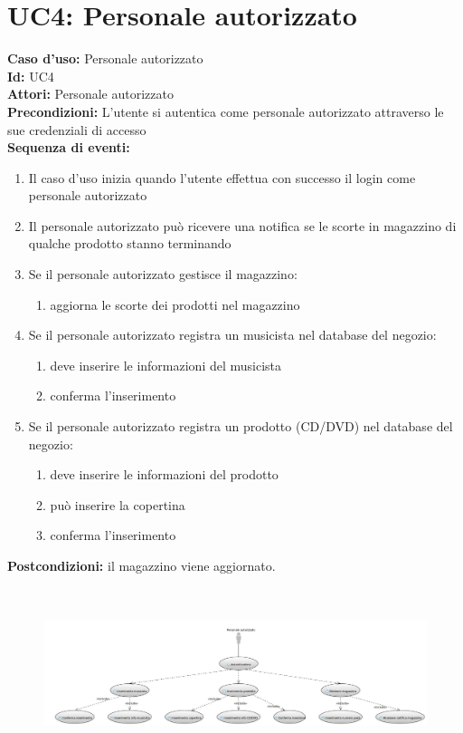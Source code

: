 \documentclass[a4paper,12pt]{report}
\begin{document}
	\section*{UC4: Personale autorizzato}
	\noindent
	\textbf{Caso d'uso:} Personale autorizzato\\
	\textbf{Id:} UC4\\
	\textbf{Attori:} Personale autorizzato\\
	\textbf{Precondizioni:} L'utente si autentica come personale autorizzato attraverso le sue credenziali di accesso\\
	\textbf{Sequenza di eventi:}
	\begin{enumerate} 
		\item Il caso d'uso inizia quando l'utente effettua con successo il login come personale autorizzato
		\item Il personale autorizzato può ricevere una notifica se le scorte in magazzino di qualche prodotto stanno terminando
		\item Se il personale autorizzato gestisce il magazzino:
		\begin{enumerate}
			\item aggiorna le scorte dei prodotti nel magazzino
		\end{enumerate}
		\item Se il personale autorizzato registra un musicista nel database del negozio:
		\begin{enumerate}
			\item deve inserire le informazioni del musicista
			\item conferma l'inserimento
		\end{enumerate}
		\item Se il personale autorizzato registra un prodotto (CD/DVD) nel database del negozio:
		\begin{enumerate}
			\item deve inserire le informazioni del prodotto
			\item può inserire la copertina
			\item conferma l'inserimento
		\end{enumerate}
	\end{enumerate}
	\textbf{Postcondizioni:} il magazzino viene aggiornato.
	
	\begin{figure}[h]
		\centering
		\includegraphics[width=\textwidth, height=5cm]{PersonaleAutorizzato}
	\end{figure}
\end{document}
